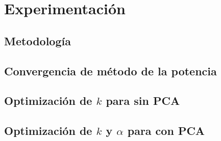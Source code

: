 \section{Experimentación}%
\label{sec:experimentacion}

\subsection{Metodología}%
\label{sub:metodologia}

\subsection{Convergencia de método de la potencia}%
\label{sub:pm}


\subsection{Optimización de $k$ para \knn{} sin PCA}%
\label{sub:knn_sin_pca}

\subsection{Optimización de $k$ y $\alpha$ para \knn{} con PCA}%
\label{sub:alpha_k_knn_pca}
